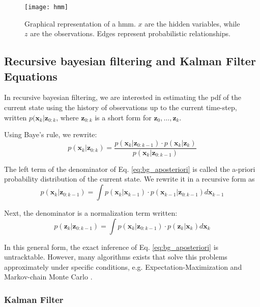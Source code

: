 \begin{figure}[!htpb]
  \centering
  \texttt{[image: hmm]}
  \caption{Graphical representation of a \gls{hmm}. $x$ are the hidden variables, while $z$ are the observations.
  Edges represent probabilistic relationships.}
  \label{fig:hmm}
\end{figure}

\subsection{Recursive bayesian filtering and Kalman Filter Equations}
In recursive bayesian filtering, we are interested in estimating the \gls{pdf} of the current state using the history of observations up to the current time-step, written $p(\bm{x}_{k}|\bm{z}_{0:k}$, where $\bm{z}_{0:k}$ is a short form for $\bm{z}_{0},\ldots, \bm{z}_{k}$.

Using Baye's rule, we rewrite:
\begin{equation}
  \label{eq:bg_aposteriori}
  p(\bm{x}_{k}|\bm{z}_{0:k}) = \frac{p(\bm{x}_{k}|\bm{z}_{0:k-1})\cdot p(\bm{x}_{k}|\bm{z}_{k})}{p(\bm{x}_{k}|\bm{z}_{0:k-1})}
\end{equation}

The left term of the denominator of Eq. \ref{eq:bg_aposteriori} is called the a-priori probability distribution of the current state.
We rewrite it in a recursive form as
\begin{equation}
  \label{eq:bg_prior}
  p(\bm{x}_{k}|\bm{z}_{0:k-1}) = \int p(\bm{x}_{k}|\bm{x}_{k-1}) \cdot p(\bm{x}_{k-1}|\bm{z}_{0:k-1}) d\bm{x}_{k-1}
\end{equation}

Next, the denominator is a normalization term written:
\begin{equation}
  \label{eq:bg_norm_cst}
  p(\bm{z}_{k}|\bm{z}_{0:k-1}) = \int p(\bm{x}_{k}|\bm{z}_{0:k-1}) \cdot p(\bm{z}_{k}|\bm{x}_{k}) d\bm{x}_{k}
\end{equation}

In this general form, the exact inference of Eq. \ref{eq:bg_aposteriori} is untracktable.
However, many algorithms exists that solve this problems approximately under specific conditions, e.g. Expectation-Maximization \cite{dempster77} and Markov-chain Monte Carlo \cite{geyer92}.

\subsubsection{Kalman Filter}

